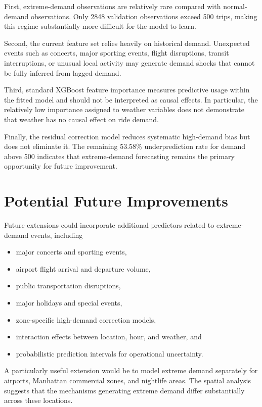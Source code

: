 \documentclass[11pt]{article}
\begin{document}
First, extreme-demand observations are relatively rare compared with
normal-demand observations. Only 2848 validation observations exceed
500 trips, making this regime substantially more difficult for the
model to learn.

Second, the current feature set relies heavily on historical demand.
Unexpected events such as concerts, major sporting events, flight
disruptions, transit interruptions, or unusual local activity may
generate demand shocks that cannot be fully inferred from lagged
demand.

Third, standard XGBoost feature importance measures predictive usage
within the fitted model and should not be interpreted as causal
effects. In particular, the relatively low importance assigned to
weather variables does not demonstrate that weather has no causal
effect on ride demand.

Finally, the residual correction model reduces systematic high-demand
bias but does not eliminate it. The remaining 53.58\% underprediction
rate for demand above 500 indicates that extreme-demand forecasting
remains the primary opportunity for future improvement.


\section{Potential Future Improvements}

Future extensions could incorporate additional predictors related to
extreme-demand events, including

\begin{itemize}

\item major concerts and sporting events,
\item airport flight arrival and departure volume,
\item public transportation disruptions,
\item major holidays and special events,
\item zone-specific high-demand correction models,
\item interaction effects between location, hour, and weather, and
\item probabilistic prediction intervals for operational uncertainty.

\end{itemize}

A particularly useful extension would be to model extreme demand
separately for airports, Manhattan commercial zones, and nightlife
areas. The spatial analysis suggests that the mechanisms generating
extreme demand differ substantially across these locations.
\end{document}
